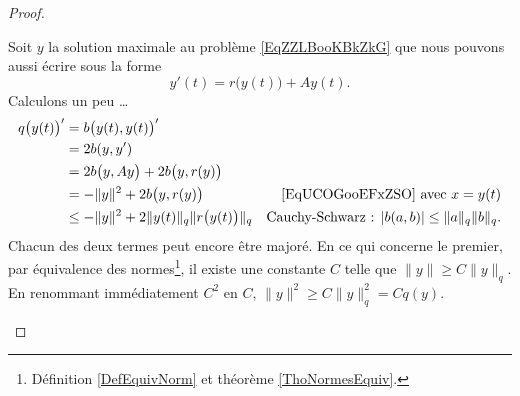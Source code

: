\begin{proof}
\begin{subproof}
    Soit \( y\) la solution maximale au problème \eqref{EqZZLBooKBkZkG} que nous pouvons aussi écrire sous la forme
    \begin{equation}
        y'(t)=r\big( y(t) \big)+Ay(t).
    \end{equation}
    Calculons un peu \ldots
    \begin{subequations}    \label{subeqsZCOLooOzTBLr}
        \begin{align}
            q\big( y(t) \big)'&=b\big( y(t),y(t) \big)'\\
            &=2b(y,y')\\
            &=2b\big( y,Ay \big)+2b\big( y,r(y) \big)\\
            &=-\| y \|^2+2b\big( y,r(y) \big)       &\text{\eqref{EqUCOGooEFxZSO} avec \( x=y(t)\)}\\
            &\leq -\| y \|^2+2\| y(t) \|_q\| r\big( y(t) \big) \|_q &\text{Cauchy-Schwarz : \( | b(a,b) |\leq \| a \|_q\| b \|_q\).}
        \end{align}
    \end{subequations}
    Chacun des deux termes peut encore être majoré. En ce qui concerne le premier, par équivalence des normes\footnote{Définition \ref{DefEquivNorm} et théorème \ref{ThoNormesEquiv}.}, il existe une constante \( C\) telle que \( \| y \|\geq C \| y \|_q\). En renommant immédiatement $C^2$ en \( C\), \( \| y \|^2\geq C\| y \|_q^2=Cq(y)\).


\end{subproof}
\end{proof}
